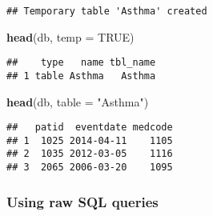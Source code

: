 \documentclass[]{article}
\newenvironment{Shaded}{\begin{snugshade}}{\end{snugshade}}
\newcommand{\KeywordTok}[1]{\textcolor[rgb]{0.13,0.29,0.53}{\textbf{{#1}}}}
\newcommand{\DataTypeTok}[1]{\textcolor[rgb]{0.13,0.29,0.53}{{#1}}}
\newcommand{\StringTok}[1]{\textcolor[rgb]{0.31,0.60,0.02}{{#1}}}
\newcommand{\OtherTok}[1]{\textcolor[rgb]{0.56,0.35,0.01}{{#1}}}
\newcommand{\NormalTok}[1]{{#1}}
\begin{document}
\begin{Shaded}
\end{Shaded}

\begin{verbatim}
## Temporary table 'Asthma' created
\end{verbatim}

\begin{Shaded}
\begin{Highlighting}[]
\KeywordTok{head}\NormalTok{(db, }\DataTypeTok{temp =} \OtherTok{TRUE}\NormalTok{)}
\end{Highlighting}
\end{Shaded}

\begin{verbatim}
##    type   name tbl_name
## 1 table Asthma   Asthma
\end{verbatim}

\begin{Shaded}
\begin{Highlighting}[]
\KeywordTok{head}\NormalTok{(db, }\DataTypeTok{table =} \StringTok{"Asthma"}\NormalTok{)}
\end{Highlighting}
\end{Shaded}

\begin{verbatim}
##   patid  eventdate medcode
## 1  1025 2014-04-11    1105
## 2  1035 2012-03-05    1116
## 3  2065 2006-03-20    1095
\end{verbatim}

\subsubsection{Using raw SQL queries}\label{using-raw-sql-queries}
\end{document}
